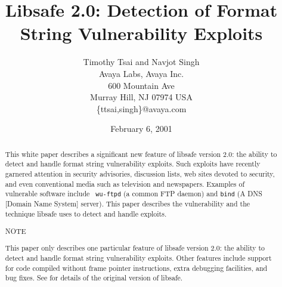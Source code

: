 \documentclass[]{article}
\begin{document}




\begin{singlespace}

\title{ Libsafe 2.0: Detection of Format String Vulnerability Exploits }

\author{
	Timothy Tsai and Navjot Singh \\
	Avaya Labs, Avaya Inc. \\
	600 Mountain Ave \\
	Murray Hill, NJ  07974  USA \\
	\{ttsai,singh\}@avaya.com \\
}

\date{February 6, 2001}

\maketitle

\end{singlespace}



\begin{singlespace}

\begin{abstract}

This white paper describes a significant new feature of libsafe version 2.0:
the ability to detect and handle format string vulnerability exploits.  Such
exploits have recently garnered attention in security advisories, discussion
lists, web sites devoted to security, and even conventional media such as
television and newspapers.  Examples of vulnerable software include {\tt
wu-ftpd} (a common FTP daemon) and {\tt bind} (A DNS [Domain Name System]
server).  This paper describes the vulnerability and the technique libsafe uses
to detect and handle exploits.

\begin{Ventry}{NOTE}
\item[NOTE]
    This paper only describes one particular feature of libsafe version 2.0:
    the ability to detect and handle format string vulnerability exploits.
    Other features include support for code compiled without frame pointer
    instructions, extra debugging facilities, and bug fixes.  See \cite{usenix}
    for details of the original version of libsafe.
\end{Ventry}

\end{abstract}

\end{singlespace}
\end{document}
